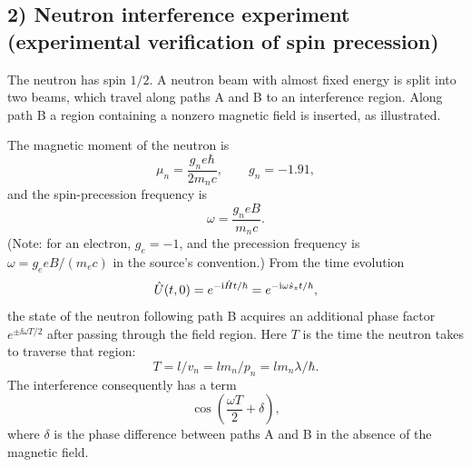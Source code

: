 \subsection*{2) Neutron interference experiment (experimental verification of spin precession)}
The neutron has spin $1/2$. A neutron beam with almost fixed energy is split into two beams, which travel along paths A and B to an interference region. Along path B a region containing a nonzero magnetic field is inserted, as illustrated.
\begin{center}
\end{center}
The magnetic moment of the neutron is
\begin{equation}
\mu_n=\frac{g_ne\hbar}{2m_nc},\qquad g_n=-1.91,
\end{equation}
and the spin-precession frequency is
\begin{equation}
\omega=\frac{g_neB}{m_nc}.
\end{equation}
(Note: for an electron, $g_e=-1$, and the precession frequency is $\omega=g_eeB/(m_ec)$ in the source's convention.) From the time evolution
\begin{equation}
\hat{U}(t,0)=e^{-\mathrm{i}\hat{H}t/\hbar}=e^{-\mathrm{i}\omega\hat{s}_zt/\hbar},
\end{equation}
the state of the neutron following path B acquires an additional phase factor $e^{\pm\ii\omega T/2}$ after passing through the field region. Here $T$ is the time the neutron takes to traverse that region:
\begin{equation}
T=l/v_n=lm_n/p_n=lm_n\lambda/\hbar.
\end{equation}
The interference consequently has a term
\begin{equation}
\cos\!\left(\frac{\omega T}{2}+\delta\right),
\end{equation}
where $\delta$ is the phase difference between paths A and B in the absence of the magnetic field.

